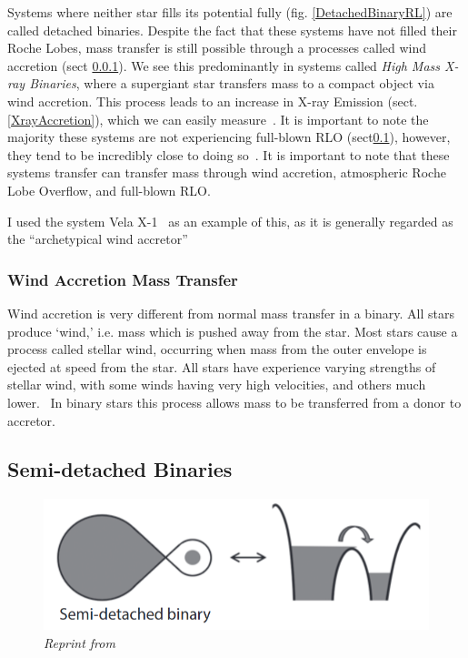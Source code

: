 \documentclass[12pt, a4paper]{article}
\begin{document}
        Systems where neither star fills its potential fully (fig. \ref{DetachedBinaryRL}) are called detached binaries. Despite the fact that these systems have not filled their Roche Lobes, mass transfer is still possible through a processes called wind accretion (sect \ref{WindAccretion}). We see this predominantly in systems called \textit{High Mass X-ray Binaries}, where a supergiant star transfers mass to a compact object via wind accretion. This process leads to an increase in X-ray Emission (sect. \ref{XrayAccretion}), which we can easily measure~\parencite{TaurisvandenHeuvel+2023}. It is important to note the majority these systems are not experiencing full-blown RLO (sect\ref{RLO}), however, they tend to be incredibly close to doing so~\parencite{TaurisvandenHeuvel+2023}. It is important to note that these systems transfer can transfer mass through wind accretion, atmospheric Roche Lobe Overflow, and full-blown RLO. 

        I used the system Vela X-1~\parencite{Kretschmar_2021} as an example of this, as it is generally regarded as the ``archetypical wind accretor''~\parencite{Kretschmar_2021} 

        \subsubsection{Wind Accretion Mass Transfer} \label{WindAccretion}
        Wind accretion is very different from normal mass transfer in a binary. All stars produce `wind,' i.e. mass which is pushed away from the star. Most stars cause a process called stellar wind, occurring when mass from the outer envelope is ejected at speed from the star. All stars have experience varying strengths of stellar wind, with some winds having very high velocities, and others much lower.~\parencite{Lamers_1999} In binary stars this process allows mass to be transferred from a donor to accretor.
        
        \subsection{Semi-detached Binaries}\label{RLO} %

        \begin{figure}[H] 
            \centering
            \includegraphics[scale = .4]{figs/reused-figs/Tauris_Semi-detachedBinary.png}
            \caption{\textit{Reprint from~\parencite{TaurisvandenHeuvel+2023}}}
            \label{SemidetachedRL}
        \end{figure}
\end{document}
